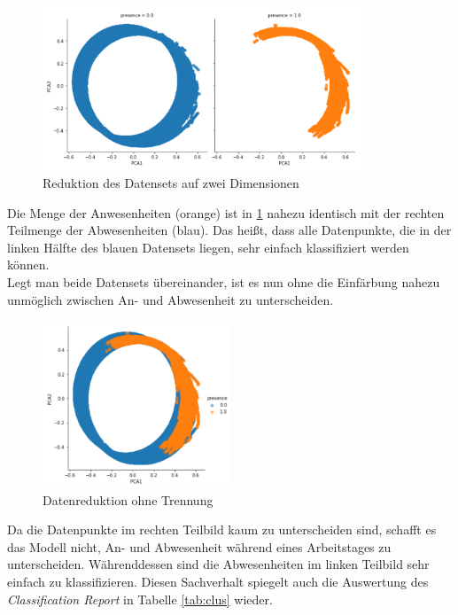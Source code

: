 \begin{figure}[h]
    \centering
    \includegraphics[width=0.85\textwidth]{pic/pca.png}
    \caption{Reduktion des Datensets auf zwei Dimensionen}
    \label{fig:pca}
\end{figure}

Die Menge der Anwesenheiten (orange) ist in \ref{fig:pca} nahezu identisch mit der rechten Teilmenge der 
Abwesenheiten (blau). 
Das heißt, dass alle Datenpunkte, die in der linken Hälfte des blauen Datensets liegen, sehr einfach klassifiziert 
werden können.\\
Legt man beide Datensets übereinander, ist es nun ohne die Einfärbung nahezu unmöglich zwischen An- und 
Abwesenheit zu unterscheiden.\\

\begin{figure}[h]
    \centering
    \includegraphics[width=0.5\textwidth]{pic/pca1.png}
    \caption{Datenreduktion ohne Trennung}
    \label{fig:pca1}
\end{figure}

Da die Datenpunkte im rechten Teilbild kaum zu unterscheiden sind, schafft es das Modell nicht, An- und Abwesenheit
während eines Arbeitstages zu unterscheiden. Währenddessen sind die Abwesenheiten im linken Teilbild sehr einfach
zu klassifizieren.
Diesen Sachverhalt spiegelt auch die Auswertung des \textit{Classification Report} in Tabelle \ref{tab:clus} wieder.\\

